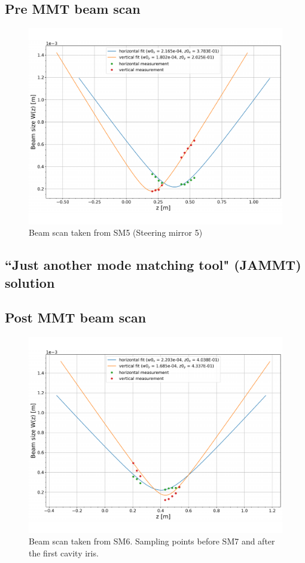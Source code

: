 \subsection{Pre MMT beam scan}

\begin{figure}[H]
\includegraphics[width=.95\textwidth]{figs/ALGAAS/beam_scans/12_18_2020_preMMT.pdf}
\caption{Beam scan taken from SM5 (Steering mirror 5)}
\label{fig:beamscan2020}
\end{figure}

\subsection{``Just another mode matching tool" (JAMMT) solution}
\subsection{Post MMT beam scan}

\begin{figure}[H]
\includegraphics[width=.95\textwidth]{figs/ALGAAS/beam_scans/01_12_2021_postMMT.pdf}
\caption{Beam scan taken from SM6. Sampling points before SM7 and after the first cavity iris.}
\label{fig:beamscan2021}
\end{figure}


